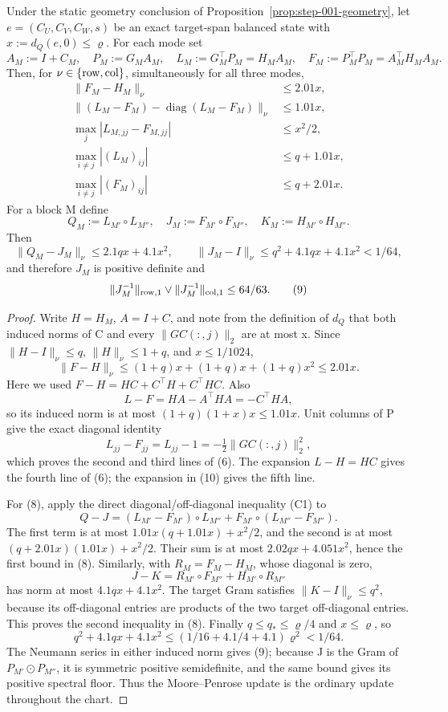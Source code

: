 \begin{lemma}\label{lem:step-011-gram-reserve}
Under the static geometry conclusion of Proposition~\ref{prop:step-001-geometry}, let
\(e=(C_U,C_V,C_W,s)\) be an exact target-span balanced state with
\(x:=d_Q(e,0)\le\varrho\). For each mode set
\[
 A_M:=I+C_M,\quad P_M:=G_MA_M,\quad
 L_M:=G_M^\top P_M=H_MA_M,\quad
 F_M:=P_M^\top P_M=A_M^\top H_MA_M.
\tag{5}
\]
Then, for \(\nu\in\{{\rm row},{\rm col}\}\), simultaneously for all
three modes,
\[
\begin{aligned}
 \|F_M-H_M\|_\nu&\le2.01x,\\
 \|(L_M-F_M)-\operatorname{diag}(L_M-F_M)\|_\nu&\le1.01x,\\
 \max_j|L_{M,jj}-F_{M,jj}|&\le x^2/2,\\
 \max_{i\ne j}|(L_M)_{ij}|&\le q+1.01x,\\
 \max_{i\ne j}|(F_M)_{ij}|&\le q+2.01x.
\end{aligned}
\tag{6}
\]
For a block M define
\[
 Q_M:=L_{M'}\circ L_{M''},\quad
 J_M:=F_{M'}\circ F_{M''},\quad
 K_M:=H_{M'}\circ H_{M''}.
\tag{7}
\]
Then
\[
 \|Q_M-J_M\|_\nu\le2.1qx+4.1x^2,
 \qquad
 \|J_M-I\|_\nu\le q^2+4.1qx+4.1x^2<1/64,
\tag{8}
\]
and therefore \(J_M\) is positive definite and
\[
 \|J_M^{-1}\|_{\rm row,1}\vee\|J_M^{-1}\|_{\rm col,1}\le64/63.
\tag{9}
\]

\begin{proof}
Write \(H=H_M\), \(A=I+C\), and note from
the definition of \(d_Q\) that both induced norms of C and every
\(\|GC(:,j)\|_2\) are at most x. Since \(\|H-I\|_\nu\le q\),
\(\|H\|_\nu\le1+q\), and \(x\le1/1024\),
\[
 \|F-H\|_\nu
 \le (1+q)x+(1+q)x+(1+q)x^2\le2.01x.
\tag{10}
\]
Here we used \(F-H=HC+C^\top H+C^\top HC\). Also
\[
 L-F=HA-A^\top HA=-C^\top HA,
\tag{11}
\]
so its induced norm is at most \((1+q)(1+x)x\le1.01x\).
Unit columns of P give the exact diagonal identity
\[
 L_{jj}-F_{jj}=L_{jj}-1=-\tfrac12\|GC(:,j)\|_2^2,
\tag{12}
\]
which proves the second and third lines of (6). The expansion
\(L-H=HC\) gives the fourth line of (6); the expansion in (10) gives the
fifth line.

For (8), apply the direct diagonal/off-diagonal inequality (C1) to
\[
 Q-J=(L_{M'}-F_{M'})\circ L_{M''}
   +F_{M'}\circ(L_{M''}-F_{M''}).
\tag{13}
\]
The first term is at most
\(1.01x(q+1.01x)+x^2/2\), and the second is at most
\((q+2.01x)(1.01x)+x^2/2\). Their sum is at most
\(2.02qx+4.051x^2\), hence the first bound in (8). Similarly, with
\(R_M=F_M-H_M\), whose diagonal is zero,
\[
 J-K=R_{M'}\circ F_{M''}+H_{M'}\circ R_{M''}
\tag{14}
\]
has norm at most \(4.1qx+4.1x^2\). The target Gram satisfies
\(\|K-I\|_\nu\le q^2\), because its off-diagonal entries are products of
the two target off-diagonal entries. This proves the second inequality in
(8). Finally \(q\le q_*\le\varrho/4\) and \(x\le\varrho\), so
\[
q^2+4.1qx+4.1x^2
\le(1/16+4.1/4+4.1)\varrho^2<1/64.
\tag{15}
\]
The Neumann series in either induced norm gives (9); because J is the Gram
of \(P_{M'}\odot P_{M''}\), it is symmetric positive semidefinite, and
the same bound gives its positive spectral floor. Thus the Moore--Penrose
update is the ordinary update throughout the chart.


\end{proof}
\end{lemma}
